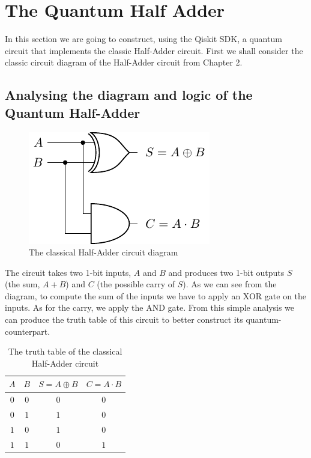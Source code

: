 \section{The Quantum Half Adder}
In this section we are going to construct, using the Qiskit SDK, a quantum circuit that implements the classic Half-Adder circuit.
First we shall consider the classic circuit diagram of the Half-Adder circuit from Chapter 2.

\subsection{Analysing the diagram and logic of the Quantum Half-Adder}

\begin{figure}[ht]
    \centering
    \includegraphics{images/5_Implementation/classical_halfadder_diagram.pdf}
    \caption{The classical Half-Adder circuit diagram}
\end{figure}

The circuit takes two 1-bit inputs, $A$ and $B$ and produces two 1-bit outputs $S$ (the sum, $A + B$) and $C$ (the possible carry of $S$).
As we can see from the diagram, to compute the sum of the inputs we have to apply an XOR gate on the inputs. As for the carry, we apply the
AND gate. From this simple analysis we can produce the truth table of this circuit to better construct its quantum-counterpart.

\begin{table}[ht]
    \centering
    \begin{tabular}{c c|c c}
        $A$ & $B$ & $S = A \oplus B$ & $C = A \cdot B$ \\
        \hline
        $0$ & $0$ & $0$ & $0$ \\
        $0$ & $1$ & $1$ & $0$ \\
        $1$ & $0$ & $1$ & $0$ \\
        $1$ & $1$ & $0$ & $1$ \\
    \end{tabular}
    \caption{The truth table of the classical Half-Adder circuit}
\end{table}

